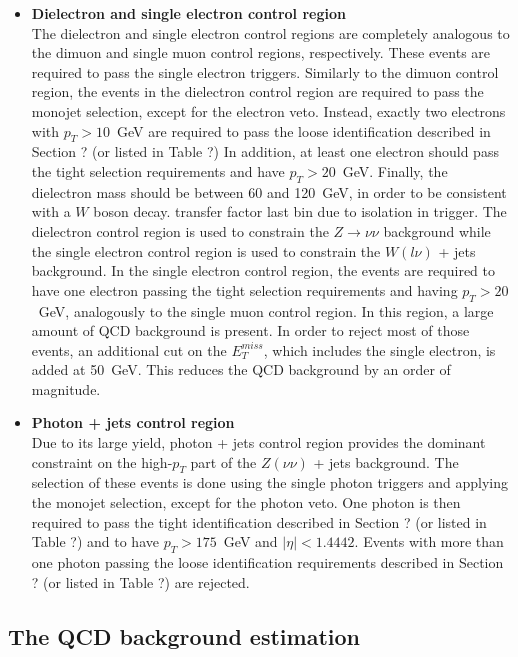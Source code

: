 \begin{itemize}
\item[] \textbf{Dielectron and single electron control region}\\ The dielectron and single electron control regions are completely analogous to the dimuon and single muon control regions, respectively. These events are required to pass the single electron triggers. Similarly to the dimuon control region, the events in the dielectron control region are required to pass the monojet selection, except for the electron veto. Instead, exactly two electrons with $p_T > 10$~GeV are required to pass the loose identification {\color{red}described in Section ? (or listed in Table ?)} In addition, at least one electron should pass the tight selection requirements and have $p_T > 20$~GeV. Finally, the dielectron mass should be between 60 and 120~GeV, in order to be consistent with a $W$ boson decay. {\color{red}transfer factor last bin due to isolation in trigger}. The dielectron control region is used to constrain the $Z\rightarrow\nu\nu$ background while the single electron control region is used to constrain the $W(l\nu)$ + jets background. In the single electron control region, the events are required to have one electron passing the tight selection requirements and having $p_T > 20$~GeV, analogously to the single muon control region. In this region, a large amount of QCD background is present. In order to reject most of those events, an additional cut on the $E_T^{miss}$, which includes the single electron, is added at 50~GeV. This reduces the QCD background by an order of magnitude.

\item[] \textbf{Photon + jets control region}\\Due to its large yield, photon + jets control region provides the dominant constraint on the high-$p_T$ part of the $Z(\nu\nu)$ + jets background. The selection of these events is done using the single photon triggers and applying the monojet selection, except for the photon veto. One photon is then required to pass the tight identification {\color{red}described in Section ? (or listed in Table ?)} and to have $p_T > 175$~GeV and $|\eta| < 1.4442$. Events with more than one photon passing the loose identification requirements {\color{red}described in Section ? (or listed in Table ?)} are rejected.
\end{itemize}

\subsection{The QCD background estimation}

